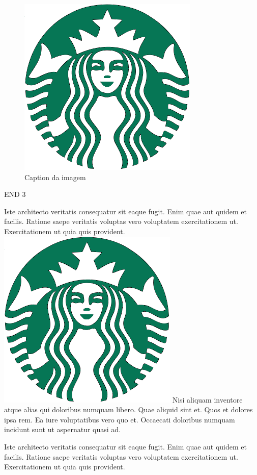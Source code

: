 \documentclass[12pt,a4paper]{article}
\begin{document}
\begin{multicols}{2}
\begin{figure}[!ht]
	\centering

	\includegraphics[width=\textwidth,keepaspectratio]{image.png}
	\caption{Caption da imagem} 
	\label{Label da imagem} 

\end{figure}

\lipsum END 3

\par Iste architecto veritatis consequatur sit eaque fugit. Enim quae aut quidem et facilis. Ratione saepe veritatis voluptas vero voluptatem exercitationem ut. Exercitationem ut quia quis provident. \includegraphics[width=0.15\columnwidth,keepaspectratio]{image.png} Nisi aliquam inventore atque alias qui doloribus numquam libero. Quae aliquid sint et. Quos et dolores ipsa rem. Ea iure voluptatibus vero quo et. Occaecati doloribus numquam incidunt sunt ut aspernatur quasi ad.


\end{multicols}




\par Iste architecto veritatis consequatur sit eaque fugit. Enim quae aut quidem et facilis. Ratione saepe veritatis voluptas vero voluptatem exercitationem ut. Exercitationem ut quia quis provident. \
\end{document}
